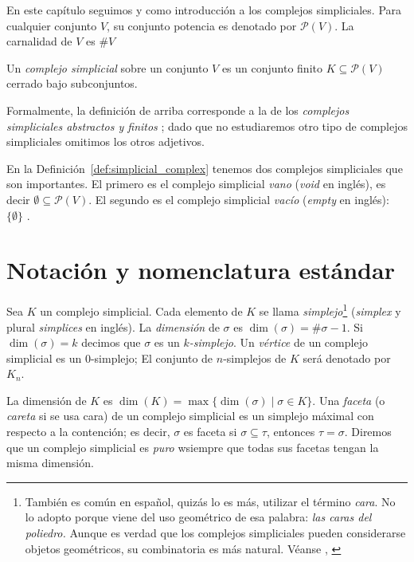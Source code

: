 \documentclass{standalone}
\begin{document}
	En este capítulo seguimos \cite{alberto:2023} y \cite{kozlov:2008:combinatorial:alg:topo} como introducción a los complejos simpliciales.
	\noindent Para cualquier conjunto $V$, su conjunto potencia es denotado por $\mathcal{P}(V)$. La carnalidad de $V$ es $\# V$
	
	\begin{definition}\label{def:simplicial_complex}
		Un \emph{complejo simplicial} sobre un conjunto $V$ es un conjunto finito $K\subseteq\mathcal{P}(V)$ cerrado bajo subconjuntos.
	\end{definition}
	
	Formalmente, la definición de arriba corresponde a la de los \emph{complejos simpliciales abstractos y finitos} \cite[Definition 2.1]{kozlov:2008:combinatorial:alg:topo}; dado que no estudiaremos otro tipo de complejos simpliciales omitimos los otros adjetivos. 
	
	\begin{remark}\label{rem:empty_complexes}
		En la Definición~\ref{def:simplicial_complex} tenemos dos complejos simpliciales que son importantes. El primero es el complejo simplicial \emph{vano} (\emph{void} en inglés), es decir $\emptyset\subseteq\mathcal{P}(V)$. El segundo es el complejo simplicial \emph{vacío} (\emph{empty} en inglés): $\{\emptyset\}$ \cite[Remark 2.3]{kozlov:2008:combinatorial:alg:topo}. 
	\end{remark}
	
	\section{Notación y nomenclatura estándar}
	
	\noindent Sea $K$ un complejo simplicial. Cada elemento de $K$ se llama \emph{simplejo}\footnote{También es común en español, quizás lo es más, utilizar el término \emph{cara}. No lo adopto porque viene del uso geométrico de esa palabra: \textit{las caras del poliedro.} Aunque es verdad que los complejos simpliciales pueden considerarse objetos geométricos, su combinatoria es más natural. Véanse \cite{kozlov:2008:combinatorial:alg:topo}, \cite{may:1967:simplicial}} (\emph{simplex} y plural \emph{simplices} en inglés). La \emph{dimensión} de $\sigma$ es $\dim(\sigma)=\#\sigma-1$. Si $\dim(\sigma)=k$ decimos que $\sigma$ es un \emph{$k$-simplejo}. Un \emph{vértice} de un complejo simplicial es un $0$-simplejo; El conjunto de  $n$-simplejos de $K$ será denotado por $K_{n}$. 
	
	La dimensión de $K$ es $\dim(K)=\max\{\dim(\sigma)\mid\sigma\in K\}$. Una \emph{faceta} (o \emph{careta} si se usa cara) de un complejo simplicial es un simplejo máximal con respecto a la contención; es decir, $\sigma$ es faceta si $\sigma\subseteq\tau$, entonces $\tau=\sigma$. Diremos que un complejo simplicial es \emph{puro} wsiempre que todas sus facetas tengan la misma dimensión.
	
\end{document}
